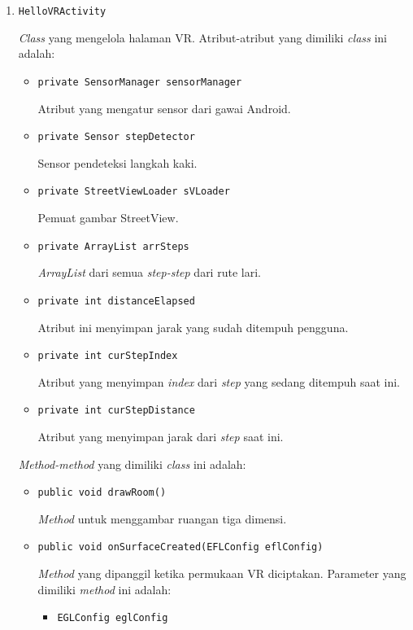 \begin{enumerate}
\begin{itemize}
	\end{itemize}
	\item \texttt{HelloVRActivity}
	
	\textit{Class} yang mengelola halaman VR. Atribut-atribut yang dimiliki \textit{class} ini adalah:
	
	\begin{itemize}
		\item \texttt{private SensorManager sensorManager}
		
		Atribut yang mengatur sensor dari gawai Android.
		\item \texttt{private Sensor stepDetector}
		
		Sensor pendeteksi langkah kaki. 
		\item \texttt{private StreetViewLoader sVLoader}
		
		Pemuat gambar StreetView.
		\item \texttt{private ArrayList arrSteps}
		
		\textit{ArrayList} dari semua \textit{step-step} dari rute lari.
		\item \texttt{private int distanceElapsed}
		
		Atribut ini menyimpan jarak yang sudah ditempuh pengguna.
		\item \texttt{private int curStepIndex}
		
		Atribut yang menyimpan \textit{index} dari \textit{step} yang sedang ditempuh saat ini.
		\item \texttt{private int curStepDistance}

		Atribut yang menyimpan jarak dari \textit{step} saat ini.		
	\end{itemize}
	
	\textit{Method-method} yang dimiliki \textit{class} ini adalah:
	
		\begin{itemize}
			\item \texttt{public void drawRoom()}
			
			\textit{Method} untuk menggambar ruangan tiga dimensi.
			\item \texttt{public void onSurfaceCreated(EFLConfig eflConfig)}
			
			\textit{Method} yang dipanggil ketika permukaan VR diciptakan. Parameter yang dimiliki \textit{method} ini adalah:
			
			\begin{itemize}
				\item \texttt{EGLConfig eglConfig}
				

\end{itemize}
\end{itemize}
\end{enumerate}
